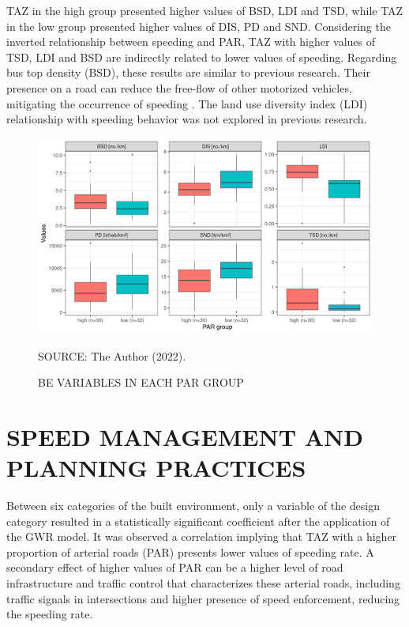 TAZ in the high group presented higher values of BSD, LDI and TSD, while TAZ in the low group presented higher values of DIS, PD and SND. Considering the inverted relationship between speeding and PAR, TAZ with higher values of TSD, LDI and BSD are indirectly related to lower values of speeding. Regarding bus top density (BSD), these results are similar to previous research. Their presence on a road can reduce the free-flow of other motorized vehicles, mitigating the occurrence of speeding \cite{Bansal2014,Koshy2005}. The land use diversity index (LDI) relationship with speeding behavior was not explored in previous research. 

\begin{figure}[!htbp]
    \footnotesize
    \captionsetup{font=footnotesize}
    \caption{BE VARIABLES IN EACH PAR GROUP}
    \centering
    \includegraphics{fig/par_hist.png}
    \label{fig:wilcox_par}
    \par SOURCE: The Author (2022).
\end{figure}

\section{SPEED MANAGEMENT AND PLANNING PRACTICES} \label{sec:sp_manag}




Between six categories of the built environment, only a variable of the design category resulted in a statistically significant coefficient after the application of the GWR model. It was observed a correlation implying that TAZ with a higher proportion of arterial roads (PAR) presents lower values of speeding rate. A secondary effect of higher values of PAR can be a higher level of road infrastructure and traffic control that characterizes these arterial roads, including traffic signals in intersections and higher presence of speed enforcement, reducing the speeding rate.

